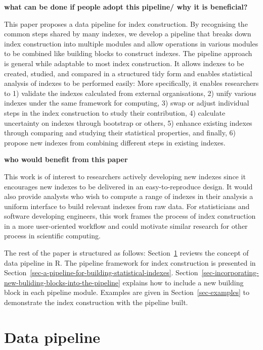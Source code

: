 \documentclass[
  letterpaper,
  DIV=11,
  numbers=noendperiod]{scrartcl}
\begin{document}
\textbf{what can be done if people adopt this pipeline/ why it is
beneficial?}

This paper proposes a data pipeline for index construction. By
recognising the common steps shared by many indexes, we develop a
pipeline that breaks down index construction into multiple modules and
allow operations in various modules to be combined like building blocks
to construct indexes. The pipeline approach is general while adaptable
to most index construction. It allows indexes to be created, studied,
and compared in a structured tidy form and enables statistical analysis
of indexes to be performed easily: More specifically, it enables
researchers to 1) validate the indexes calculated from external
organisations, 2) unify various indexes under the same framework for
computing, 3) swap or adjust individual steps in the index construction
to study their contribution, 4) calculate uncertainty on indexes through
bootstrap or others, 5) enhance existing indexes through comparing and
studying their statistical properties, and finally, 6) propose new
indexes from combining different steps in existing indexes.

\textbf{who would benefit from this paper}

This work is of interest to researchers actively developing new indexes
since it encourages new indexes to be delivered in an easy-to-reproduce
design. It would also provide analysts who wish to compute a range of
indexes in their analysis a uniform interface to build relevant indexes
from raw data. For statisticians and software developing engineers, this
work frames the process of index construction in a more user-oriented
workflow and could motivate similar research for other process in
scientific computing.

The rest of the paper is structured as follows:
Section~\ref{sec-data-pipeline-in-r} reviews the concept of data
pipeline in R. The pipeline framework for index construction is
presented in
Section~\ref{sec-a-pipeline-for-building-statistical-indexes}.
Section~\ref{sec-incorporating-new-buliding-blocks-into-the-pipeline}
explains how to include a new building block in each pipeline module.
Examples are given in Section~\ref{sec-examples} to demonstrate the
index construction with the pipeline built.

\hypertarget{sec-data-pipeline-in-r}{%
\section{Data pipeline}\label{sec-data-pipeline-in-r}}
\end{document}
